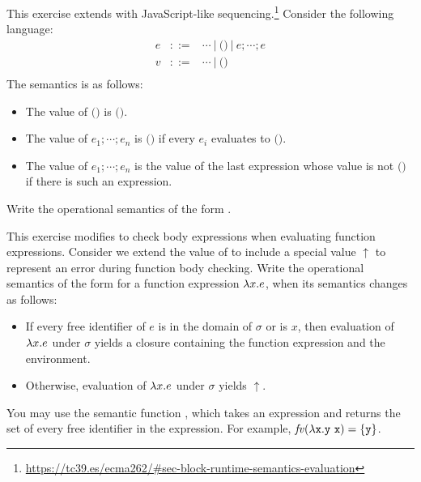 \begin{exercise}

This exercise extends \Lang with JavaScript-like
sequencing.\footnote{\url{https://tc39.es/ecma262/\#sec-block-runtime-semantics-evaluation}}
Consider the following language:
\[
  \begin{array}{rrl}
    e & ::= & \cdots\ |\ \textsf{()}\ |\ e;\cdots;e \\
    v & ::= & \cdots\ |\ \textsf{()} \\
  \end{array}
\]
The semantics is as follows:
\begin{itemize}
  \item
The value of $\textsf{()}$ is $\textsf{()}$.
  \item
The value of $e_1;\cdots;e_n$ is $\textsf{()}$
if every $e_i$ evaluates to $\textsf{()}$.
  \item
The value of $e_1;\cdots;e_n$
is the value of the last expression whose value is not $\textsf{()}$
if there is such an expression.
\end{itemize}
  Write the operational semantics of the form .

\end{exercise}

\begin{exercise}

This exercise modifies \Lang to check body expressions when evaluating
function expressions.
Consider we extend the value of \Lang to include a special value $\uparrow$
to represent an error during function body checking.
Write the operational semantics of the form
 for a function expression
$\lambda x.e$, when its semantics  changes as follows:
\begin{itemize}
\item If every free identifier of $e$ is in the domain of $\sigma$ or is $x$,
  then evaluation of $\lambda x.e$ under $\sigma$ yields a closure
  containing the function expression and the environment.
\item Otherwise, evaluation of $\lambda x.e$ under $\sigma$ yields $\uparrow$.
\end{itemize}
You may use the semantic function , which takes an
expression and returns the set of every free identifier in the expression.
For example, $\mbox{\emph{fv}}(\lambda\texttt{x}.\texttt{y}\ \texttt{x}) = \{ \texttt{y} \}$.

\end{exercise}

